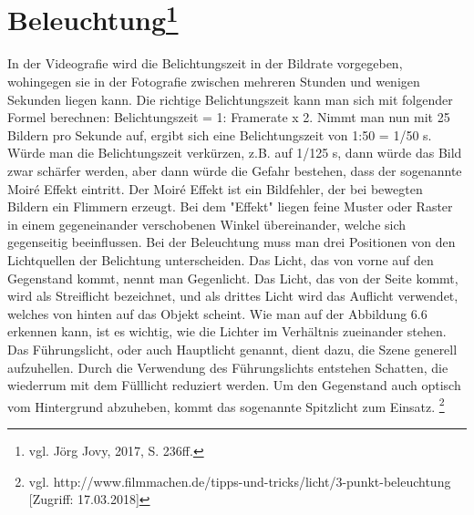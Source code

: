 \section[Beleuchtung]{Beleuchtung\protect\footnote{\label{}vgl. Jörg Jovy, 2017, S. 236ff.}}
In der Videografie wird die Belichtungszeit in der Bildrate vorgegeben, wohingegen sie in der Fotografie zwischen mehreren Stunden und wenigen Sekunden liegen kann.
Die richtige Belichtungszeit kann man sich mit folgender Formel berechnen: Belichtungszeit = 1: Framerate x 2. Nimmt man nun mit 25 Bildern pro Sekunde auf, ergibt sich eine Belichtungszeit von 1:50 = 1/50 s. Würde man die Belichtungszeit verkürzen, z.B. auf 1/125 s, dann würde das Bild zwar schärfer werden, aber dann würde die Gefahr bestehen, dass der sogenannte Moir\'{e} Effekt eintritt. Der Moir\'{e} Effekt ist ein Bildfehler, der bei bewegten Bildern ein Flimmern erzeugt. Bei dem "Effekt" liegen feine Muster oder Raster in einem gegeneinander verschobenen Winkel übereinander, welche sich gegenseitig beeinflussen. 
Bei der Beleuchtung muss man drei Positionen von den Lichtquellen der Belichtung unterscheiden. Das Licht, das von vorne auf den Gegenstand kommt, nennt man Gegenlicht. Das Licht, das von der Seite kommt, wird als Streiflicht bezeichnet, und als drittes Licht wird das Auflicht verwendet, welches von hinten auf das Objekt scheint.
Wie man auf der Abbildung 6.6 erkennen kann, ist es wichtig, wie die Lichter im Verhältnis zueinander stehen. Das Führungslicht, oder auch Hauptlicht genannt, dient dazu, die Szene generell aufzuhellen. Durch die Verwendung des Führungslichts entstehen Schatten, die wiederrum mit dem Fülllicht reduziert werden. Um den Gegenstand auch optisch vom Hintergrund abzuheben, kommt das sogenannte Spitzlicht zum Einsatz. \footnote{\label{}vgl. http://www.filmmachen.de/tipps-und-tricks/licht/3-punkt-beleuchtung [Zugriff: 17.03.2018]}

